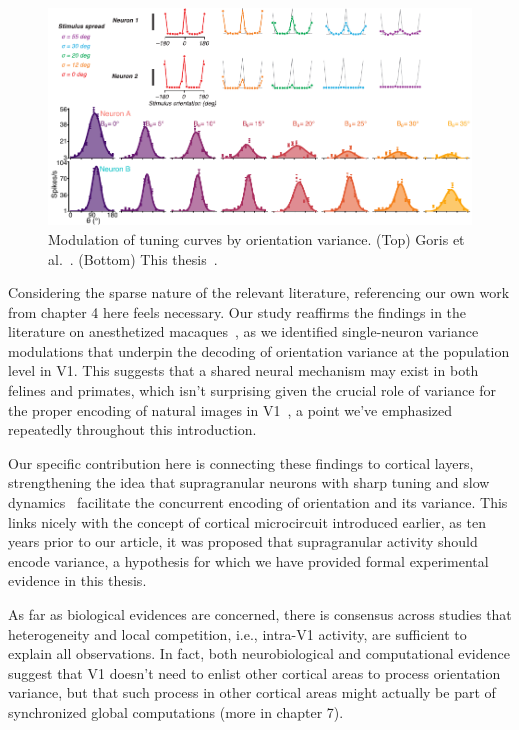 \begin{figure}[h!tbp]
\vspace{0.1cm}
\centering
\includegraphics[width=1.\textwidth]{fig/chap2_fig_goris.pdf}
\caption[Active modulation of neurons by orientation variance.]{Modulation of tuning curves by orientation variance. (Top) Goris et al.~\cite{goris2015origin}. (Bottom) This thesis~\cite{ladret2023cortical}.}
\label{fig_chap2_neuralvariance}
\end{figure}

Considering the sparse nature of the relevant literature, referencing our own work from chapter 4 here feels necessary. Our study reaffirms the findings in the literature on anesthetized macaques~\cite{goris2015origin}, as we identified single-neuron variance modulations that underpin the decoding of orientation variance at the population level in \gls{V1}. This suggests that a shared neural mechanism may exist in both felines and primates, which isn't surprising given the crucial role of variance for the proper encoding of natural images in \gls{V1}~\cite{olshausen1996emergence}, a point we've emphasized repeatedly throughout this introduction. 

Our specific contribution here is connecting these findings to cortical layers, strengthening the idea that supragranular neurons with sharp tuning and slow dynamics~\cite{ringach1997dynamics,ringach2002orientation} facilitate the concurrent encoding of orientation and its variance. This links nicely with the concept of cortical microcircuit introduced earlier, as ten years prior to our article, it was proposed that supragranular activity should encode variance, a hypothesis for which we have provided formal experimental evidence in this thesis.

As far as biological evidences are concerned, there is consensus across studies that heterogeneity and local competition, i.e., intra-V1 activity, are sufficient to explain all observations. In fact, both neurobiological and computational evidence suggest that \gls{V1} doesn't need to enlist other cortical areas to process orientation variance, but that such process in other cortical areas might actually be part of synchronized global computations (more in chapter 7). 

